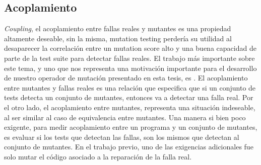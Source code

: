 \subsection{Acoplamiento}

\emph{Coupling}, el acoplamiento entre fallas reales y mutantes es una propiedad altamente deseable, sin la misma, mutation testing perder\'ia su utilidad al desaparecer la correlaci\'on entre un mutation score alto y una buena capacidad de parte de la test suite para detectar fallas reales. El trabajo m\'as importante sobre este tema, y uno que nos representa una motivaci\'on importante para el desarrollo de nuestro operador de mutaci\'on presentado en esta tesis, es \cite{bibliography.mutation.evaluation.valid-substitute}. El acoplamiento entre mutantes y fallas reales es una relaci\'on que especifica que si un conjunto de tests detecta un conjunto de mutantes, entonces va a detectar una falla real. Por el otro lado, el acoplamiento entre mutantes, representa una situaci\'on indeseable, al ser similar al caso de equivalencia entre mutantes. Una manera si bien poco exigente, para medir acoplamiento entre un programa y un conjunto de mutantes, es evaluar si los tests que detectan las fallas, son los mismos que detectan al conjunto de mutantes. En el trabajo previo, uno de las exigencias adicionales fue solo mutar el c\'odigo asociado a la reparaci\'on de la falla real.

%
